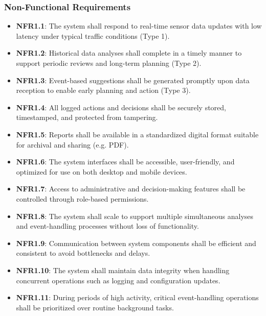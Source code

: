 \subsubsection{Non-Functional Requirements}
\begin{itemize}
    \item \textbf{NFR1.1}: The system shall respond to real-time sensor data updates with low latency under typical traffic conditions (Type 1).
    \item \textbf{NFR1.2}: Historical data analyses shall complete in a timely manner to support periodic reviews and long-term planning (Type 2).
    \item \textbf{NFR1.3}: Event-based suggestions shall be generated promptly upon data reception to enable early planning and action (Type 3).
    \item \textbf{NFR1.4}: All logged actions and decisions shall be securely stored, timestamped, and protected from tampering.
    \item \textbf{NFR1.5}: Reports shall be available in a standardized digital format suitable for archival and sharing (e.g. PDF).
    \item \textbf{NFR1.6}: The system interfaces shall be accessible, user-friendly, and optimized for use on both desktop and mobile devices.
    \item \textbf{NFR1.7}: Access to administrative and decision-making features shall be controlled through role-based permissions.
    \item \textbf{NFR1.8}: The system shall scale to support multiple simultaneous analyses and event-handling processes without loss of functionality.
    \item \textbf{NFR1.9}: Communication between system components shall be efficient and consistent to avoid bottlenecks and delays.
    \item \textbf{NFR1.10}: The system shall maintain data integrity when handling concurrent operations such as logging and configuration updates.
    \item \textbf{NFR1.11}: During periods of high activity, critical event-handling operations shall be prioritized over routine background tasks.
\end{itemize}